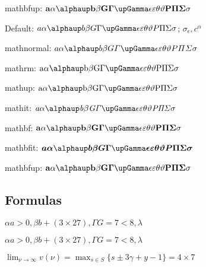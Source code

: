 \documentclass[12pt, a4paper, oneside]{article}
\newcommand{\mathup}[1]{\mathrm{#1}}
\newcommand{\mathbfit}[1]{\bm{#1}}
\newcommand{\mathbfup}[1]{\mathbf{#1}}
\theoremstyle{Plain}
\theoremstyle{Definition}
\theoremstyle{Remark}
\begin{document}
\begin{appendix}
{{mathbfup: $\mathbfup{a \alpha \alphaup b \beta G \Gamma \upGamma \epsilon \varepsilon \theta \vartheta P \Pi \Sigma \sigma}$
}

\bigskip

{\sffamily\bfseries

Default: $a \alpha \alphaup b \beta G \Gamma \upGamma \epsilon \varepsilon \theta \vartheta P \Pi \Sigma \sigma$; $\sigma_\epsilon, c^\alpha$

mathnormal: $\mathnormal{a \alpha \alphaup b \beta G \Gamma \upGamma \epsilon \varepsilon \theta \vartheta P \Pi \Sigma \sigma}$

mathrm: $\mathrm{a \alpha \alphaup b \beta G \Gamma \upGamma \epsilon \varepsilon \theta \vartheta P \Pi \Sigma \sigma}$

mathup: $\mathup{a \alpha \alphaup b \beta G \Gamma \upGamma \epsilon \varepsilon \theta \vartheta P \Pi \Sigma \sigma}$

mathit: $\mathit{a \alpha \alphaup b \beta G \Gamma \upGamma \epsilon \varepsilon \theta \vartheta P \Pi \Sigma \sigma}$

mathbf: $\mathbf{a \alpha \alphaup b \beta G \Gamma \upGamma \epsilon \varepsilon \theta \vartheta P \Pi \Sigma \sigma}$

mathbfit: $\mathbfit{a \alpha \alphaup b \beta G \Gamma \upGamma \epsilon \varepsilon \theta \vartheta P \Pi \Sigma \sigma}$

mathbfup: $\mathbfup{a \alpha \alphaup b \beta G \Gamma \upGamma \epsilon \varepsilon \theta \vartheta P \Pi \Sigma \sigma}$
}
}

\subsection{Formulas \showfamily}

\setlength{\parindent}{0pt}

\noindent%
\checkgreekletters

\noindent%
{\boldmath\checkgreekletters}

\noindent%
{\sffamily\selectfont \checkgreekletters}

\noindent%
{\sffamily\bfseries\selectfont \checkgreekletters}

\noindent%
{\sffamily $\alpha a > 0, \beta b + (3 \times 27), \Gamma G = 7 < 8, \lambda$}

\noindent%
$\alpha a > 0, \beta b + (3 \times 27), \Gamma G = 7 < 8, \lambda$

$\lim_{\nu \to \infty} v(\nu) = \max_{s \in S} \{s \pm 3 \gamma + y - 1\} = 4 \times 7$


\end{appendix}
\end{document}
